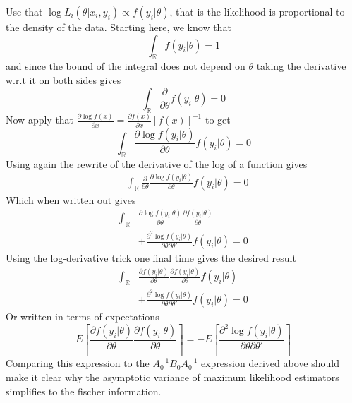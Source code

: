Use that $\log L_i(\theta |x_i, y_i) \propto f(y_i | \theta)$, that is the likelihood is proportional to the density of the data. Starting here, we know that
\begin{equation}
\int_{\mathbb{R}} f(y_i | \theta) = 1
\end{equation}
and since the bound of the integral does not depend on $\theta$ taking the derivative w.r.t it on both sides gives
\begin{equation}
\int_{\mathbb{R}} \frac{\partial}{\partial \theta} f(y_i | \theta) = 0
\end{equation}
Now apply that $\frac{\partial \log f(x)}{\partial x} = \frac{\partial f(x)}{\partial x} [f(x)]^{-1}$ to get
\begin{equation}
\int_{\mathbb{R}} \frac{\partial \log f(y_i | \theta)}{\partial \theta}  f(y_i | \theta) = 0
\end{equation}
Using again the rewrite of the derivative of the log of a function gives
\begin{align}
&\int_{\mathbb{R}} \frac{\partial}{\partial \theta} \frac{\partial \log f(y_i | \theta)}{\partial \theta}  f(y_i | \theta) = 0
\end{align}
Which when written out gives
\begin{align*}
 \int_{\mathbb{R}}  &\frac{\partial \log f(y_i | \theta)}{\partial \theta}  \frac{\partial f(y_i | \theta)}{\partial \theta}
\\ &+ \frac{\partial^2 \log f(y_i | \theta)}{\partial \theta \partial \theta'} f(y_i|\theta)
 = 0
\end{align*}
Using the log-derivative trick one final time gives the desired result
\begin{align*}
 \int_{\mathbb{R}}  &\frac{\partial f(y_i | \theta)}{\partial \theta}  \frac{\partial f(y_i | \theta)}{\partial \theta} f(y_i | \theta)
\\ &+ \frac{\partial^2 \log f(y_i | \theta)}{\partial \theta \partial \theta'} f(y_i|\theta)
 = 0
\end{align*}
Or written in terms of expectations
\begin{equation}
E \left[
\frac{\partial f(y_i | \theta)}{\partial \theta}  \frac{\partial f(y_i | \theta)}{\partial \theta}
\right]
= - E\left[
\frac{\partial^2 \log f(y_i | \theta)}{\partial \theta \partial \theta'}
\right]
\end{equation}
Comparing this expression to the $A_0^{-1}B_0A_0^{-1}$ expression derived above should make it clear why the asymptotic variance of maximum likelihood estimators simplifies to the fischer information.
